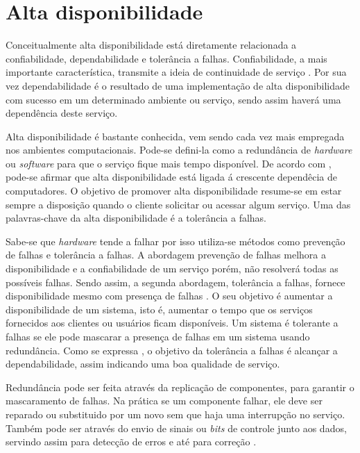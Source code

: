 \chapter{Alta disponibilidade}
Conceitualmente alta disponibilidade está diretamente relacionada a confiabilidade, dependabilidade e tolerância a falhas. 
Confiabilidade, a mais importante característica, transmite a ideia de continuidade de serviço \cite{pankaj1994}.
Por sua vez dependabilidade é o resultado de uma implementação de alta disponibilidade com sucesso em um determinado ambiente ou serviço,
sendo assim haverá uma dependência deste serviço.

Alta disponibilidade é bastante conhecida, vem sendo cada vez mais empregada nos ambientes computacionais.
Pode-se defini-la como a redundância de \textit{hardware} ou \textit{software} para que o serviço fique mais tempo disponível.
De acordo com \cite{costa2009}, pode-se afirmar que alta disponibilidade está ligada á crescente dependêcia de computadores.
O objetivo de promover alta disponibilidade resume-se em estar sempre a disposição quando o cliente solicitar ou acessar algum serviço.
Uma das palavras-chave da alta disponibilidade é a tolerância a falhas.

Sabe-se que \textit{hardware} tende a falhar por isso utiliza-se métodos como prevenção de falhas e tolerância a falhas.
A abordagem prevenção de falhas melhora a disponibilidade e a confiabilidade de um serviço porém, não resolverá todas as possíveis falhas.
Sendo assim, a segunda abordagem, tolerância a falhas, fornece disponibilidade mesmo com presença de falhas \cite{pankaj1994}.
O seu objetivo é aumentar a disponibilidade de um sistema, isto é, aumentar o tempo que os serviços fornecidos aos clientes ou usuários ficam disponíveis. 
Um sistema é tolerante a falhas se ele pode mascarar a presença de falhas em um sistema usando redundância. Como se expressa \cite{costa2009}, 
o objetivo da tolerância a falhas é alcançar a dependabilidade, assim indicando uma boa qualidade de serviço.

Redundância pode ser feita através da replicação de componentes, para garantir o mascaramento de falhas.
Na prática se um componente falhar, ele deve ser reparado ou substituido por um novo sem que haja uma interrupção no serviço.
Também pode ser através do envio de sinais ou \textit{bits} de controle junto aos dados, servindo assim para detecção de erros e até para correção \cite{weber2002}.

